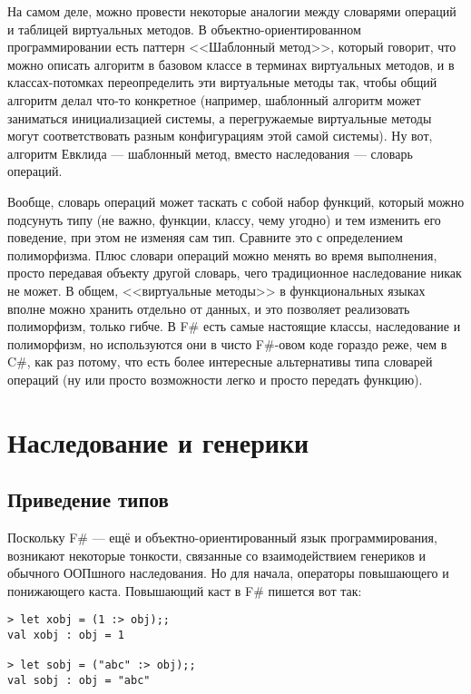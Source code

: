 \documentclass{../../text-style}
\begin{document}
На самом деле, можно провести некоторые аналогии между словарями операций и таблицей виртуальных методов. В объектно-ориентированном программировании есть паттерн <<Шаблонный метод>>, который говорит, что можно описать алгоритм в базовом классе в терминах виртуальных методов, и в классах-потомках переопределить эти виртуальные методы так, чтобы общий алгоритм делал что-то конкретное (например, шаблонный алгоритм может заниматься инициализацией системы, а перегружаемые виртуальные методы могут соответствовать разным конфигурациям этой самой системы). Ну вот, алгоритм Евклида --- шаблонный метод, вместо наследования --- словарь операций. 

Вообще, словарь операций может таскать с собой набор функций, который можно подсунуть типу (не важно, функции, классу, чему угодно) и тем изменить его поведение, при этом не изменяя сам тип. Сравните это с определением полиморфизма. Плюс словари операций можно менять во время выполнения, просто передавая объекту другой словарь, чего традиционное наследование никак не может. В общем, <<виртуальные методы>> в функциональных языках вполне можно хранить отдельно от данных, и это позволяет реализовать полиморфизм, только гибче. В F\# есть самые настоящие классы, наследование и полиморфизм, но используются они в чисто F\#-овом коде гораздо реже, чем в C\#, как раз потому, что есть более интересные альтернативы типа словарей операций (ну или просто возможности легко и просто передать функцию).

\section{Наследование и генерики}

\subsection{Приведение типов}

Поскольку F\# --- ещё и объектно-ориентированный язык программирования, возникают некоторые тонкости, связанные со взаимодействием генериков и обычного ООПшного наследования. Но для начала, операторы повышающего и понижающего каста. Повышающий каст в F\# пишется вот так:

\begin{verbatim}
> let xobj = (1 :> obj);;
val xobj : obj = 1

> let sobj = ("abc" :> obj);;
val sobj : obj = "abc"
\end{verbatim}
\end{document}
